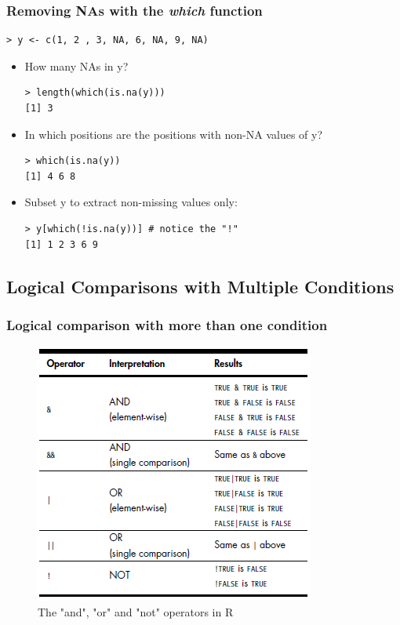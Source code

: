 \documentclass[xcolor=dvipsnames, xcolor=table]{beamer} %
\theoremstyle{mystyle}
\begin{document}
\begin{frame}[fragile] %
\frametitle{Removing NAs with the \textit{which} function}

\begin{verbatim}
> y <- c(1, 2 , 3, NA, 6, NA, 9, NA)
\end{verbatim}

\begin{itemize}

\item How many NAs in y?

\begin{verbatim}
> length(which(is.na(y)))
[1] 3
\end{verbatim}

\item In which positions are the positions with non-NA values of y?

\begin{verbatim}
> which(is.na(y)) 
[1] 4 6 8
\end{verbatim}

\item Subset y to extract non-missing values only:

\begin{verbatim}
> y[which(!is.na(y))] # notice the "!"
[1] 1 2 3 6 9            
\end{verbatim}
\end{itemize}

\end{frame}

\subsection{Logical Comparisons with Multiple Conditions}

\begin{frame}[fragile] %
\frametitle{Logical comparison with more than one condition}

\begin{figure}[H]
\includegraphics[scale = .6]{Screenshot_2}
\caption{The "and", "or" and "not" operators in R}
\end{figure}

\end{frame}
\end{document}
